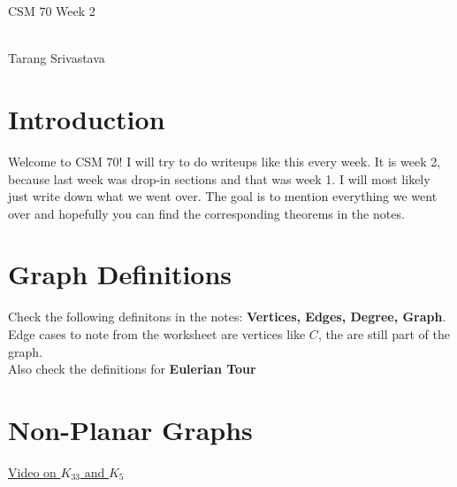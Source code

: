 \documentclass[10pt, twocolumn]{article}
\author{Tarang Srivastava}
\newcommand{\makechaptertitle}[1]{
\begin{center}
	\begin{large}
		#1
	\end{large}
	\begin{small}
		\\Tarang Srivastava
	\end{small}
\end{center}
}
\theoremstyle{definition}
\theoremstyle{definition}
\begin{document}
\makechaptertitle{CSM 70 Week 2}

\section{Introduction}
    Welcome to CSM 70! I will try to do writeups like this every week. 
    It is week 2, because last week was drop-in sections and that was week 1.
    I will most likely just write down what we went over. 
    The goal is to mention everything we went over and hopefully you can find the corresponding theorems in the notes. 
\section{Graph Definitions}
Check the following definitons in the notes: \textbf{Vertices, Edges, Degree, Graph}. 
Edge cases to note from the worksheet are vertices like $ C $, the are still part of the graph. \\
Also check the definitions for \textbf{Eulerian Tour}
\section{Non-Planar Graphs}
\href{https://youtu.be/xBkTIp6ajAg}{Video on $K_{33}$ and $ K_{5}$ }
\end{document}
